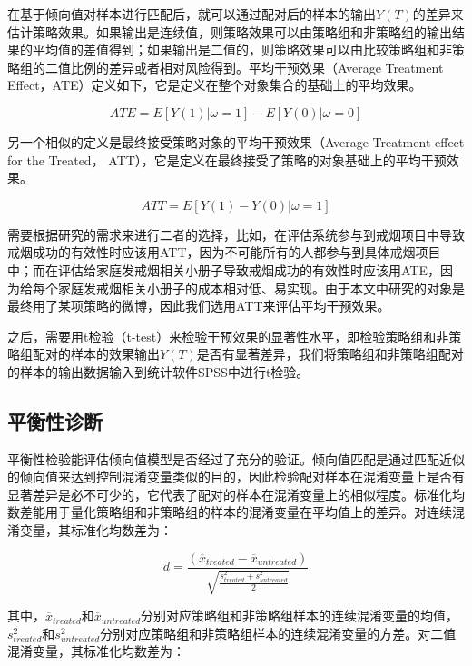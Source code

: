 在基于倾向值对样本进行匹配后，就可以通过配对后的样本的输出$Y(T)$的差异来估计策略效果。如果输出是连续值，则策略效果可以由策略组和非策略组的输出结果的平均值的差值得到；如果输出是二值的，则策略效果可以由比较策略组和非策略组的二值比例的差异或者相对风险得到。平均干预效果（Average Treatment Effect，ATE）定义如下，它是定义在整个对象集合的基础上的平均效果。

\begin{equation}
ATE = E[Y(1)|\omega=1] - E[Y(0)|\omega=0]
\end{equation}

另一个相似的定义是最终接受策略对象的平均干预效果（Average Treatment effect for the Treated， ATT），它是定义在最终接受了策略的对象基础上的平均干预效果。

\begin{equation}
ATT = E[Y(1) - Y(0) | \omega= 1]
\end{equation}

需要根据研究的需求来进行二者的选择，比如，在评估系统参与到戒烟项目中导致
戒烟成功的有效性时应该用ATT，因为不可能所有的人都参与到具体戒烟项目中；而在评估给家庭发戒烟相关小册子导致戒烟成功的有效性时应该用ATE，因为给每个家庭发戒烟相关小册子的成本相对低、易实现。由于本文中研究的对象是最终用了某项策略的微博，因此我们选用ATT来评估平均干预效果。

之后，需要用t检验（t-test）来检验干预效果的显著性水平，即检验策略组和非策略组配对的样本的效果输出$Y(T)$是否有显著差异，我们将策略组和非策略组配对的样本的输出数据输入到统计软件SPSS中进行t检验。

\subsection{平衡性诊断}

平衡性检验能评估倾向值模型是否经过了充分的验证。倾向值匹配是通过匹配近似的倾向值来达到控制混淆变量类似的目的，因此检验配对样本在混淆变量上是否有显著差异是必不可少的，它代表了配对的样本在混淆变量上的相似程度。标准化均数差能用于量化策略组和非策略组的样本的混淆变量在平均值上的差异。对连续混淆变量，其标准化均数差为：

\begin{equation}
d = \frac{(\overline{x}_{treated} - \overline{x}_{untreated})}{\sqrt{\frac{s_{treated}^2 + s_{untreated}^2}{2}}}
\end{equation}

其中，$\overline{x}_{treated}$和$\overline{x}_{untreated}$分别对应策略组和非策略组样本的连续混淆变量的均值， $s_{treated}^2$和$s_{untreated}^2$分别对应策略组和非策略组样本的连续混淆变量的方差。对二值混淆变量，其标准化均数差为：

